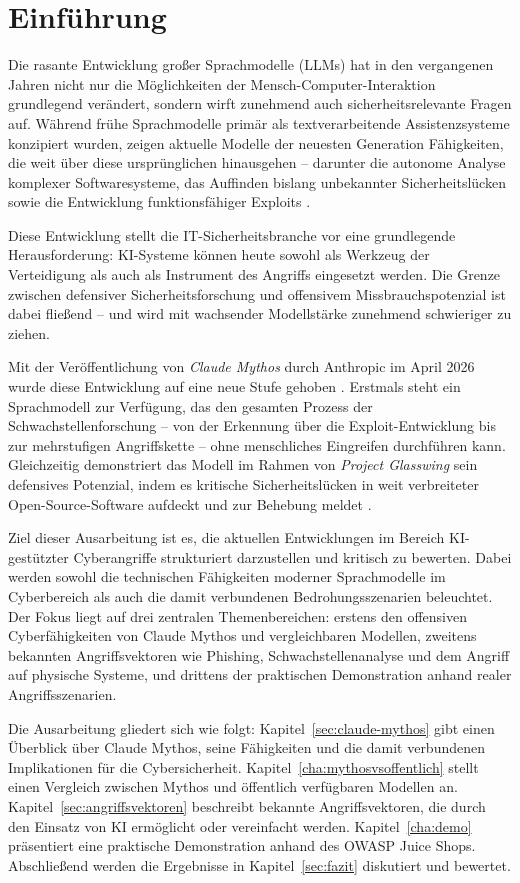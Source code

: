 \section{Einführung}
\label{sec:einführung}

Die rasante Entwicklung großer Sprachmodelle (LLMs) hat in den vergangenen Jahren nicht nur die Möglichkeiten der
Mensch-Computer-Interaktion grundlegend verändert, sondern wirft
zunehmend auch sicherheitsrelevante Fragen auf. Während frühe
Sprachmodelle primär als textverarbeitende Assistenzsysteme konzipiert
wurden, zeigen aktuelle Modelle der neuesten Generation Fähigkeiten,
die weit über diese ursprünglichen hinausgehen -- darunter
die autonome Analyse komplexer Softwaresysteme, das Auffinden bislang
unbekannter Sicherheitslücken sowie die Entwicklung funktionsfähiger
Exploits \cite{anthropic_mythos_preview}.

Diese Entwicklung stellt die IT-Sicherheitsbranche vor eine grundlegende
Herausforderung: KI-Systeme können heute sowohl als Werkzeug der
Verteidigung als auch als Instrument des Angriffs eingesetzt werden.
Die Grenze zwischen defensiver Sicherheitsforschung und offensivem
Missbrauchspotenzial ist dabei fließend -- und wird mit wachsender
Modellstärke zunehmend schwieriger zu ziehen.

Mit der Veröffentlichung von \emph{Claude Mythos} durch Anthropic im
April 2026 wurde diese Entwicklung auf eine neue Stufe gehoben
\cite{anthropic_mythos_preview}. Erstmals steht ein Sprachmodell zur
Verfügung, das den gesamten Prozess der Schwachstellenforschung --
von der Erkennung über die Exploit-Entwicklung bis zur mehrstufigen
Angriffskette -- ohne menschliches Eingreifen durchführen kann.
Gleichzeitig demonstriert das Modell im Rahmen von \emph{Project Glasswing} sein defensives Potenzial, indem es kritische
Sicherheitslücken in weit verbreiteter Open-Source-Software aufdeckt
und zur Behebung meldet \cite{anthropic_glasswing}.

Ziel dieser Ausarbeitung ist es, die aktuellen Entwicklungen im
Bereich KI-gestützter Cyberangriffe strukturiert darzustellen und
kritisch zu bewerten. Dabei werden sowohl die technischen Fähigkeiten
moderner Sprachmodelle im Cyberbereich als auch die damit verbundenen
Bedrohungsszenarien beleuchtet. Der Fokus liegt
auf drei zentralen Themenbereichen: erstens den offensiven
Cyberfähigkeiten von Claude Mythos und vergleichbaren Modellen,
zweitens bekannten Angriffsvektoren wie Phishing, Schwachstellenanalyse
und dem Angriff auf physische Systeme, und drittens der praktischen
Demonstration anhand realer Angriffsszenarien.

Die Ausarbeitung gliedert sich wie folgt: Kapitel~\ref{sec:claude-mythos}
gibt einen Überblick über Claude Mythos, seine Fähigkeiten und die
damit verbundenen Implikationen für die Cybersicherheit. Kapitel~\ref{cha:mythosvsoffentlich}
stellt einen Vergleich zwischen Mythos und öffentlich verfügbaren
Modellen an. Kapitel~\ref{sec:angriffsvektoren} beschreibt bekannte Angriffsvektoren, die
durch den Einsatz von KI ermöglicht oder vereinfacht werden. Kapitel~\ref{cha:demo} präsentiert eine praktische Demonstration anhand des OWASP Juice Shops. 
Abschließend werden die Ergebnisse in Kapitel~\ref{sec:fazit}
diskutiert und bewertet.
